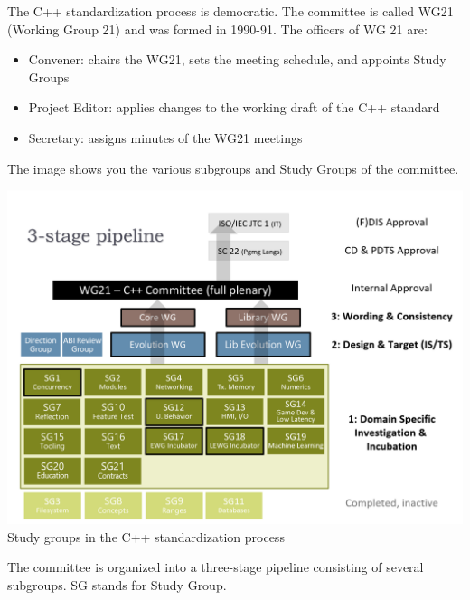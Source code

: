 
The C++ standardization process is democratic. The committee is called WG21 (Working Group 21) and was formed in 1990-91. The officers of WG 21 are:

\begin{itemize}
\item 
Convener: chairs the WG21, sets the meeting schedule, and appoints Study Groups

\item 
Project Editor: applies changes to the working draft of the C++ standard

\item 
Secretary: assigns minutes of the WG21 meetings
\end{itemize}

The image shows you the various subgroups and Study Groups of the committee.

\begin{center}
\includegraphics[width=1.0\textwidth]{content/1/chapter2/images/1.png}\\
Study groups in the C++ standardization process
\end{center}

The committee is organized into a three-stage pipeline consisting of several subgroups. SG stands for Study Group.